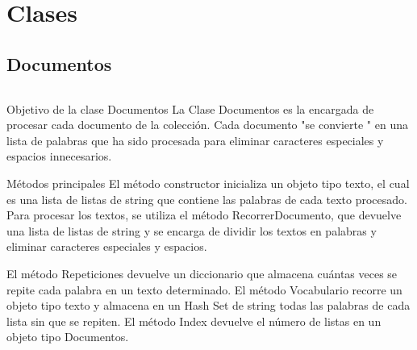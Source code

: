 \documentclass[11pt]{beamer}
\begin{document}
	\section {Clases}
	
	
	\subsection {Documentos}
	\begin{frame}
		\begin{columns}
			\begin{column}{.4\textwidth}
				\tableofcontents[sections={1-2},currentsection, currentsubsection]
			\end{column}
			\begin{column}{.4\textwidth}
				\tableofcontents[sections={3-4},currentsection , currentsubsection]
			\end{column}
		\end{columns}
	\end{frame}
	
	
	\begin{frame}{Objetivo de la clase Documentos}
		\justifying
		La Clase Documentos es la encargada de procesar cada documento de la colección. Cada documento "se convierte " en una lista de palabras que ha sido procesada para eliminar caracteres especiales y espacios innecesarios.
	\end{frame}
	\begin{frame}{Métodos principales}
		\justifying
		El método constructor inicializa un objeto tipo texto, el cual es una lista de listas de string que contiene las palabras de cada texto procesado. Para procesar los textos, se utiliza el método RecorrerDocumento, que devuelve una lista de listas de string y se encarga de dividir los textos en palabras y eliminar caracteres especiales y espacios.
		
		El método Repeticiones devuelve un diccionario que almacena cuántas veces se repite cada palabra en un texto determinado. El método Vocabulario recorre un objeto tipo texto y almacena en un Hash Set de string todas las palabras de cada lista sin que se repiten. El método Index devuelve el número de listas en un objeto tipo Documentos.
		
	\end{frame}
\end{document}

